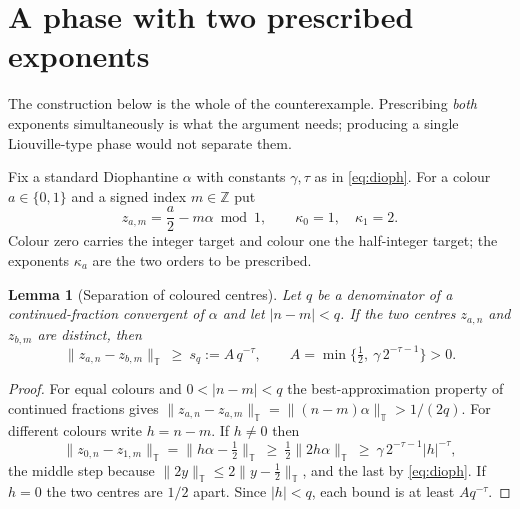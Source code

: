 \documentclass[11pt,reqno]{amsart}
\theoremstyle{plain}
\newtheorem{lemma}[theorem]{Lemma}
\theoremstyle{definition}
\theoremstyle{remark}
\numberwithin{equation}{section}
\begin{document}
\section{A phase with two prescribed exponents}
\label{sec:construction}

The construction below is the whole of the counterexample. Prescribing
\emph{both}
exponents simultaneously is what the argument needs; producing a single
Liouville-type phase would not separate them.

Fix a standard Diophantine $\alpha$ with constants $\gamma,\tau$ as in
\eqref{eq:dioph}. For a colour $a\in\{0,1\}$ and a signed index
$m\in\mathbb Z$ put
\begin{equation}
  \label{eq:centers}
  z_{a,m}=\frac a2-m\alpha \bmod 1,
  \qquad
  \kappa_0=1,\quad \kappa_1=2 .
\end{equation}
Colour zero carries the integer target and colour one the half-integer
target; the exponents $\kappa_a$ are the two orders to be prescribed.

\begin{lemma}[Separation of coloured centres]
  \label{lem:separation}
  Let $q$ be a denominator of a continued-fraction convergent of $\alpha$
  and let $|n-m|<q$. If the two centres $z_{a,n}$ and $z_{b,m}$ are
  distinct, then
  \begin{equation}
    \label{eq:sq}
    \lVert z_{a,n}-z_{b,m}\rVert_{\mathbb T}\ \ge\ s_q:=A\,q^{-\tau},
    \qquad
    A=\min\{\tfrac12,\ \gamma\,2^{-\tau-1}\}>0 .
  \end{equation}
\end{lemma}

\begin{proof}
  For equal colours and $0<|n-m|<q$ the best-approximation property of
  continued fractions gives
  $\lVert z_{a,n}-z_{a,m}\rVert_{\mathbb T}
   =\lVert(n-m)\alpha\rVert_{\mathbb T}>1/(2q)$.
  For different colours write $h=n-m$. If $h\ne0$ then
  \begin{equation*}
    \lVert z_{0,n}-z_{1,m}\rVert_{\mathbb T}
    =\bigl\lVert h\alpha-\tfrac12\bigr\rVert_{\mathbb T}
    \ \ge\ \tfrac12\lVert 2h\alpha\rVert_{\mathbb T}
    \ \ge\ \gamma\,2^{-\tau-1}|h|^{-\tau},
  \end{equation*}
  the middle step because $\lVert2y\rVert_{\mathbb T}\le2\lVert y-\tfrac12\rVert_{\mathbb T}$,
  and the last by \eqref{eq:dioph}. If $h=0$ the two centres are $1/2$
  apart. Since $|h|<q$, each bound is at least $A q^{-\tau}$.
\end{proof}
\end{document}
